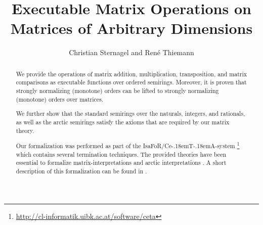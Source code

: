 \documentclass[11pt,a4paper]{article}
\newcommand\isafor{\textsf{IsaFoR}}
\newcommand\ceta{\textsf{Ce\kern-.18emT\kern-.18emA}}
\begin{document}
\title{Executable Matrix Operations on Matrices of Arbitrary Dimensions}
\author{Christian Sternagel and Ren\'e Thiemann}
\maketitle

\begin{abstract}
  We provide the operations of matrix addition, multiplication,
  transposition, and matrix comparisons as executable functions over
  ordered semirings. Moreover, it is proven that strongly normalizing (monotone) orders 
  can be lifted to strongly normalizing (monotone) orders over matrices. 
  
  We further show that the standard semirings over the naturals, integers, and
  rationals, as well as the arctic semirings satisfy the axioms that are required
  by our matrix theory.
  
  Our formalization was performed as part of the \isafor/\ceta-system 
  \cite{CeTA}\footnote{\url{http://cl-informatik.uibk.ac.at/software/ceta}}
  which
  contains several termination techniques. The provided theories have been
  essential to formalize matrix-interpretations \cite{MatrixJAR} and
  arctic interpretations \cite{Arctic}.
  A short description of this formalization can be found in \cite{WST10}.
\end{abstract}

\tableofcontents








\end{document}
